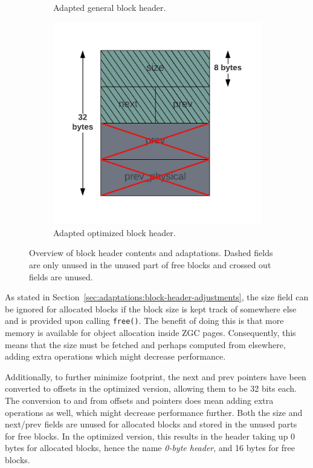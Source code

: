 \begin{figure}[H]
\begin{subfigure}[b]{0.3\textwidth}
        \caption{Adapted general block header.}
        \label{fig:blockheader_adap_general}
    \end{subfigure}%
    \hfill
    \begin{subfigure}[b]{0.3\textwidth}
        \centering
        \includegraphics[width=\textwidth]{figures/blockheader_adap_optimized.png}
        \caption{Adapted optimized block header.}
        \label{fig:blockheader_adap_optimized}
    \end{subfigure}
    \caption{Overview of block header contents and adaptations. Dashed fields are only unused in the unused part of free blocks and crossed out fields are unused.}
    \label{fig:blockheader_adaptations}
\end{figure}

As stated in Section~\ref{sec:adaptations:block-header-adjustments}, the size field can be ignored for allocated blocks if the block size is kept track of somewhere else and is provided upon calling \texttt{free()}. The benefit of doing this is that more memory is available for object allocation inside ZGC pages. Consequently, this means that the size must be fetched and perhaps computed from elsewhere, adding extra operations which might decrease performance. 

Additionally, to further minimize footprint, the next and prev pointers have been converted to offsets in the optimized version, allowing them to be 32 bits each. The conversion to and from offsets and pointers does mean adding extra operations as well, which might decrease performance further. Both the size and next/prev fields are unused for allocated blocks and stored in the unused parts for free blocks. In the optimized version, this results in the header taking up 0 bytes for allocated blocks, hence the name \textit{0-byte header}, and 16 bytes for free blocks.

